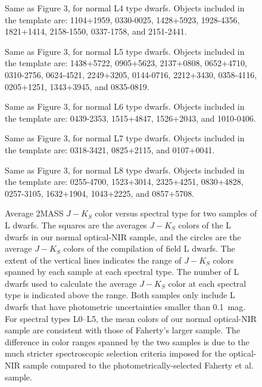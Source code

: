 \documentclass[12pt,preprint]{aastex}
\begin{document}
\begin{figure}
	\caption{Same as Figure 3, for normal L4 type dwarfs. Objects included in the template are: 1104+1959, 0330-0025, 1428+5923, 1928-4356, 1821+1414, 2158-1550, 0337-1758, and 2151-2441.}
	\label{fig:L4field}
\end{figure}

\begin{figure}
	\caption{Same as Figure 3, for normal L5 type dwarfs. Objects included in the template are: 1438+5722, 0905+5623, 2137+0808, 0652+4710, 0310-2756, 0624-4521, 2249+3205, 0144-0716, 2212+3430, 0358-4116, 0205+1251, 1343+3945, and 0835-0819.}
	\label{fig:L5field}
\end{figure}

\begin{figure}
	\caption{Same as Figure 3, for normal L6 type dwarfs. Objects included in the template are: 0439-2353, 1515+4847, 1526+2043, and 1010-0406.}
	\label{fig:L6field}
\end{figure}

\begin{figure}
	\caption{Same as Figure 3, for normal L7 type dwarfs. Objects included in the template are: 0318-3421, 0825+2115, and 0107+0041.}
	\label{fig:L7field}
\end{figure}

\begin{figure}
	\caption{Same as Figure 3, for normal L8 type dwarfs. Objects included in the template are: 0255-4700, 1523+3014, 2325+4251, 0830+4828, 0257-3105, 1632+1904, 1043+2225, and 0857+5708.}
	\label{fig:L8field}
\end{figure}
\clearpage


\begin{figure}
		\caption{Average 2MASS $J-K_S$ color versus spectral type for two samples of L dwarfs. The squares are the averages $J-K_S$ colors of the L dwarfs in our normal optical-NIR sample, and the circles are the average $J-K_S$ colors of the \citet{Faherty13_0355} compilation of field L dwarfs. The extent of the vertical lines indicates the range of $J-K_S$ colors spanned by each sample at each spectral type. The number of L dwarfs used to calculate the average $J-K_S$ color at each spectral type is indicated above the range. Both samples only include L dwarfs that have photometric uncertainties smaller than 0.1~mag. For spectral types L0--L5, the mean colors of our normal optical-NIR sample are consistent with those of Faherty's larger sample. The difference in color ranges spanned by the two samples is due to the much stricter spectroscopic selection criteria imposed for the optical-NIR sample compared to the photometrically-selected Faherty et al. sample. 
}
	\label{fig:JK_colors_F13}
\end{figure}
\end{document}
